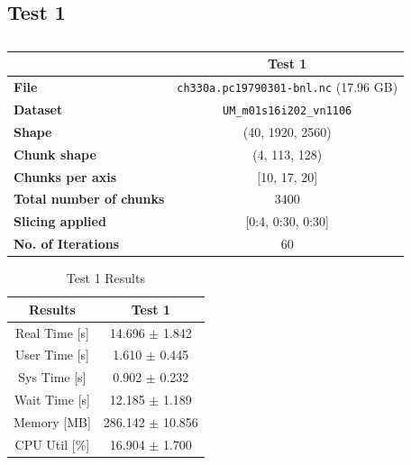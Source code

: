 \documentclass{article}
\begin{document}
\subsection{Test 1}
\begin{table}[h!] 
    \centering 
    \begin{tabular}{lc}  \hline
                                        & Test 1                                          \\ \hline
        \textbf{File}                   & \texttt{ch330a.pc19790301-bnl.nc}  (17.96  GB)  \\  
        \textbf{Dataset}                & \texttt{UM\_m01s16i202\_vn1106}                 \\ 
        \textbf{Shape}                  & (40, 1920, 2560)                                \\ 
        \textbf{Chunk shape}            & (4, 113, 128)                                   \\ 
        \textbf{Chunks per axis}        & [10, 17, 20]                                    \\ 
        \textbf{Total number of chunks} & 3400                                            \\ 
        \textbf{Slicing applied}        & [0:4, 0:30, 0:30]                               \\ 
        \textbf{No. of Iterations}      & 60                                              \\  \hline
    \end{tabular} 
    \caption{} 
    \label{tab:T1_Conditions} 
\end{table}


\begin{table}[h!]
    \centering
    \begin{tabular}{cc}
        \hline
        \textbf{Results} & Test 1              \\ \hline
        Real Time [s]    & 14.696 $\pm$ 1.842   \\
        User Time [s]    & 1.610  $\pm$ 0.445   \\
        Sys Time [s]     & 0.902  $\pm$ 0.232   \\
        Wait Time [s]    & 12.185 $\pm$ 1.189   \\
        Memory [MB]      & 286.142 $\pm$ 10.856 \\
        CPU Util [\%]    & 16.904 $\pm$ 1.700   \\
        \hline
    \end{tabular}
    \caption{Test 1 Results}
    \label{tab:T1_Results}
\end{table}
\end{document}
